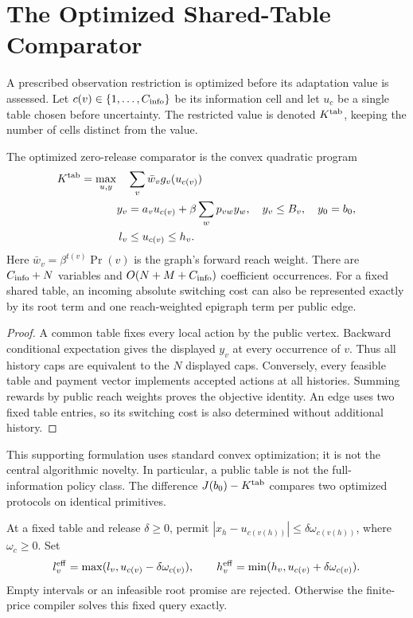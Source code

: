 \section{The Optimized Shared-Table Comparator}\label{sec:shared}
A prescribed observation restriction is optimized before its adaptation value is assessed. Let $c(v)\in\{1,\ldots,C_{\rm info}\}$ be its information cell and let $u_c$ be a single table chosen before uncertainty. The restricted value is denoted $K^{\rm tab}$, keeping the number of cells distinct from the value.

\begin{proposition}\label{prop:shared-zero}
The optimized zero-release comparator is the convex quadratic program
\begin{align}
 K^{\rm tab}=\max_{u,y}\quad&\sum_v\bar w_vg_v(u_{c(v)})\label{eq:table-r30}\\
 y_v&=a_vu_{c(v)}+\beta\sum_wp_{vw}y_w,\quad y_v\leq B_v,\quad y_0=b_0,\nonumber\\
 l_v&\leq u_{c(v)}\leq h_v.\nonumber
\end{align}
Here $\bar w_v=\beta^{t(v)}\Pr(v)$ is the graph's forward reach weight. There are $C_{\rm info}+N$ variables and $O(N+M+C_{\rm info})$ coefficient occurrences. For a fixed shared table, an incoming absolute switching cost can also be represented exactly by its root term and one reach-weighted epigraph term per public edge.
\end{proposition}
\begin{proof}
A common table fixes every local action by the public vertex. Backward conditional expectation gives the displayed $y_v$ at every occurrence of $v$. Thus all history caps are equivalent to the $N$ displayed caps. Conversely, every feasible table and payment vector implements accepted actions at all histories. Summing rewards by public reach weights proves the objective identity. An edge uses two fixed table entries, so its switching cost is also determined without additional history.\end{proof}
This supporting formulation uses standard convex optimization; it is not the central algorithmic novelty. In particular, a public table is not the full-information policy class. The difference $J(b_0)-K^{\rm tab}$ compares two optimized protocols on identical primitives.

At a fixed table and release $\delta\geq0$, permit $|x_h-u_{c(v(h))}|\leq\delta\omega_{c(v(h))}$, where $\omega_c\geq0$. Set
\[
 l_v^{\rm eff}=\max(l_v,u_{c(v)}-\delta\omega_{c(v)}),\qquad
 h_v^{\rm eff}=\min(h_v,u_{c(v)}+\delta\omega_{c(v)}).
\]
Empty intervals or an infeasible root promise are rejected. Otherwise the finite-price compiler solves this fixed query exactly.

